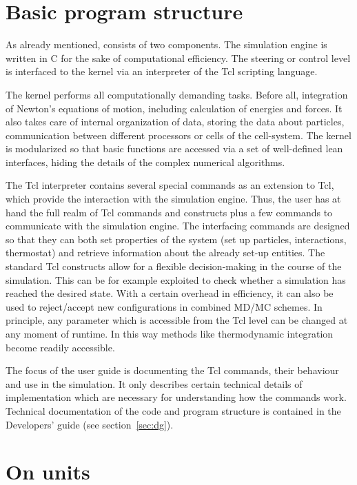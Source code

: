 \section{Basic program structure}
\label{sec:structure}

As already mentioned, \es consists of two components.
The simulation engine is written in C for the sake
of computational efficiency. The steering or control
level is interfaced to the kernel via an interpreter 
of the Tcl scripting language.

The kernel performs all computationally demanding tasks. Before all,
integration of Newton's equations of motion, including calculation of
energies and forces. It also takes care of internal organization of
data, storing the data about particles, communication between
different processors or cells of the cell-system. The kernel is
modularized so that basic functions are accessed via a set of
well-defined lean interfaces, hiding the details of the complex
numerical algorithms.

The Tcl interpreter contains several special commands as an extension
to Tcl, which provide the interaction with the simulation
engine. Thus, the user has at hand the full realm of Tcl commands and
constructs plus a few commands to communicate with the simulation
engine. The interfacing commands are designed so that they can both
set properties of the system (set up particles, interactions,
thermostat) and retrieve information about the already set-up
entities. The standard Tcl constructs allow for a flexible
decision-making in the course of the simulation. This can be for
example exploited to check whether a simulation has reached the
desired state.  With a certain overhead in efficiency, it can also be
used to reject/accept new configurations in combined MD/MC schemes. In
principle, any parameter which is accessible from the Tcl level can be
changed at any moment of runtime.  In this way methods like
thermodynamic integration become readily accessible.

The focus of the user guide is documenting the Tcl commands, their
behaviour and use in the simulation. It only describes certain
technical details of implementation which are necessary for
understanding how the commands work.  Technical documentation of the
code and program structure is contained in the Developers' guide (see
section~\ref{sec:dg}).

\section{On units}
\label{sec:units}


